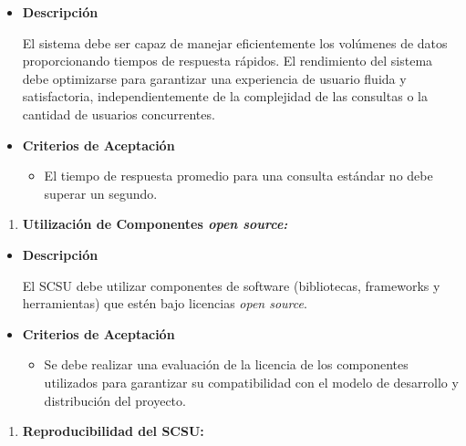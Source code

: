 \documentclass[
  12pt,
  openany]{book}
\providecommand{\tightlist}{%
  \setlength{\itemsep}{0pt}\setlength{\parskip}{0pt}}
\begin{document}
\begin{itemize}
\item
  \textbf{Descripción}

  El sistema debe ser capaz de manejar eficientemente los volúmenes de datos proporcionando tiempos de respuesta rápidos. El rendimiento del sistema debe optimizarse para garantizar una experiencia de usuario fluida y satisfactoria, independientemente de la complejidad de las consultas o la cantidad de usuarios concurrentes.
\item
  \textbf{Criterios de Aceptación}

  \begin{itemize}
  \item
    El tiempo de respuesta promedio para una consulta estándar no debe superar un segundo.

    \newpage
  \end{itemize}
\end{itemize}

\begin{enumerate}
\def\labelenumi{\arabic{enumi}.}
\setcounter{enumi}{1}
\tightlist
\item
  \textbf{Utilización de Componentes \emph{open source:}}
\end{enumerate}

\begin{itemize}
\item
  \textbf{Descripción}

  El SCSU debe utilizar componentes de software (bibliotecas, frameworks y herramientas) que estén bajo licencias \emph{open source}.
\item
  \textbf{Criterios de Aceptación}

  \begin{itemize}
  \tightlist
  \item
    Se debe realizar una evaluación de la licencia de los componentes utilizados para garantizar su compatibilidad con el modelo de desarrollo y distribución del proyecto.
  \end{itemize}
\end{itemize}

\begin{enumerate}
\def\labelenumi{\arabic{enumi}.}
\setcounter{enumi}{2}
\tightlist
\item
  \textbf{Reproducibilidad del SCSU:}
\end{enumerate}
\end{document}
